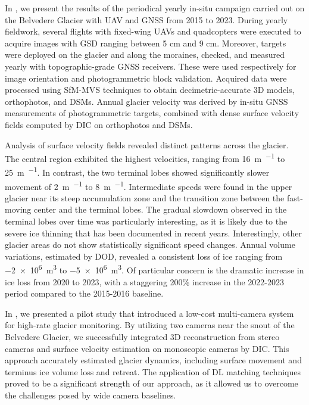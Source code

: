 In , we present the results of the periodical yearly in-situ campaign carried out on the Belvedere Glacier with UAV and GNSS from 2015 to 2023.
During yearly fieldwork, several flights with fixed-wing UAVs and quadcopters were executed to acquire images with GSD ranging between 5 cm and 9 cm. 
Moreover, targets were deployed on the glacier and along the moraines, checked, and measured yearly with topographic-grade GNSS receivers.
These were used respectively for image orientation and photogrammetric block validation.
Acquired data were processed using SfM-MVS techniques to obtain decimetric-accurate 3D models, orthophotos, and DSMs. 
Annual glacier velocity was derived by in-situ GNSS measurements of photogrammetric targets, combined with dense surface velocity fields computed by DIC on orthophotos and DSMs. 

Analysis of surface velocity fields revealed distinct patterns across the glacier. 
The central region exhibited the highest velocities, ranging from \SI{16}{\meter\per\year} to \SI{25}{\meter\per\year}.
In contrast, the two terminal lobes showed significantly slower movement of \SI{2}{\meter\per\year} to \SI{8}{\meter\per\year}.
Intermediate speeds were found in the upper glacier near its steep accumulation zone and the transition zone between the fast-moving center and the terminal lobes.  
The gradual slowdown observed in the terminal lobes over time was particularly interesting, as it is likely due to the severe ice thinning that has been documented in recent years. 
Interestingly, other glacier areas do not show statistically significant speed changes.
Annual volume variations, estimated by DOD, revealed a consistent loss of ice ranging from \SI{-2e6}{\cubic\meter} to \SI{-5e6}{\cubic\meter}.
Of particular concern is the dramatic increase in ice loss from 2020 to 2023, with a staggering 200\% increase in the 2022-2023 period compared to the 2015-2016 baseline.

In , we presented a pilot study that introduced a low-cost multi-camera system for high-rate glacier monitoring. 
By utilizing two cameras near the snout of the Belvedere Glacier, we successfully integrated 3D reconstruction from stereo cameras and surface velocity estimation on monoscopic cameras by DIC. 
This approach accurately estimated glacier dynamics, including surface movement and terminus ice volume loss and retreat. 
The application of DL matching techniques proved to be a significant strength of our approach, as it allowed us to overcome the challenges posed by wide camera baselines. 

